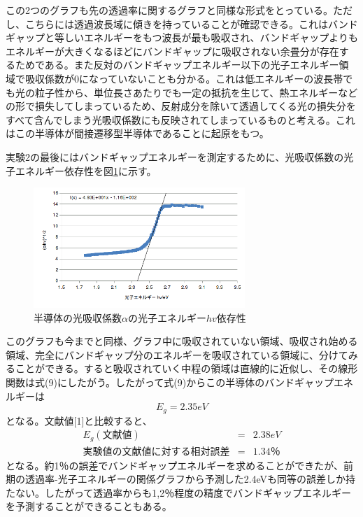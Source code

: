 \documentclass[11pt,a4j]{jsarticle}
\begin{document}
 この2つのグラフも先の透過率に関するグラフと同様な形式をとっている。ただし、こちらには透過波長域に傾きを持っていることが確認できる。これはバンドギャップと等しいエネルギーをもつ波長が最も吸収され、バンドギャップよりもエネルギーが大きくなるほどにバンドギャップに吸収されない余畳分が存在するためである。また反対のバンドギャップエネルギー以下の光子エネルギー領域で吸収係数が0になっていないことも分かる。これは低エネルギーの波長帯でも光の粒子性から、単位長さあたりでも一定の抵抗を生じて、熱エネルギーなどの形で損失してしまっているため、反射成分を除いて透過してくる光の損失分をすべて含んでしまう光吸収係数にも反映されてしまっているものと考える。これはこの半導体が間接遷移型半導体であることに起原をもつ。
 
 実験2の最後にはバンドギャップエネルギーを測定するために、光吸収係数の光子エネルギー依存性を図\ref{fig:alphahv-hv}に示す。
 
 \begin{figure}[htbp]
  \centering
  \includegraphics[width=8cm,clip]{1_2_alphahv-hv.png}
  \caption{半導体の光吸収係数$\alpha$の光子エネルギー$hv$依存性}
  \label{fig:alphahv-hv}
 \end{figure}%
 
 このグラフも今までと同様、グラフ中に吸収されていない領域、吸収され始める領域、完全にバンドギャップ分のエネルギーを吸収されている領域に、分けてみることができる。すると吸収されていく中程の領域は直線的に近似し、その線形関数は式(9)にしたがう。したがって式(9)からこの半導体のバンドギャップエネルギーは
 \begin{equation}
 E_g = 2.35eV \nonumber
 \end{equation}
 となる。文献値[1]と比較すると、
 \begin{eqnarray}
 E_g(文献値) &=& 2.38eV \nonumber \\
 実験値の文献値に対する相対誤差 &=& 1.34 ％ \nonumber
 \end{eqnarray}
 となる。約1％の誤差でバンドギャップエネルギーを求めることができたが、前期の透過率-光子エネルギーの関係グラフから予測した2.4eVも同等の誤差しか持たない。したがって透過率からも1,2％程度の精度でバンドギャップエネルギーを予測することができることもある。
  
\end{document}
